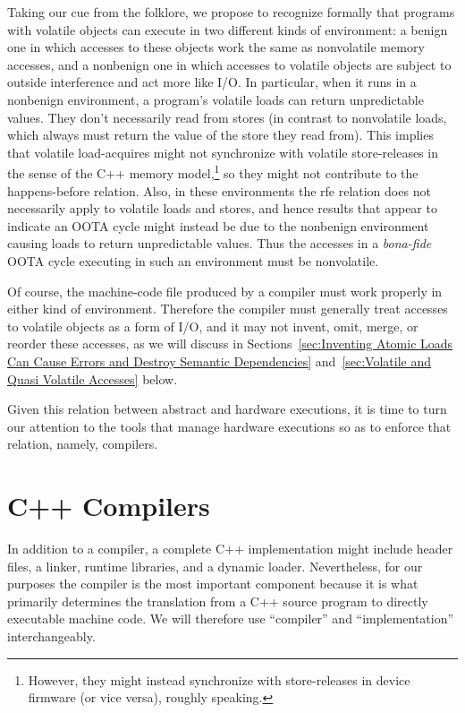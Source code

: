 Taking our cue from the folklore, we propose to recognize formally
that programs with volatile objects can execute in two different kinds
of environment: a benign one in which accesses to these objects work
the same as nonvolatile memory accesses, and a nonbenign one in which
accesses to volatile objects are subject to outside interference and
act more like I/O.
In particular, when it runs in a nonbenign environment, a program's
volatile loads can return unpredictable values.
They don't necessarily read from stores (in contrast to nonvolatile loads,
which always must return the value of the store they read from).
This implies that volatile load-acquires might not synchronize with
volatile store-releases in the sense of the C++ memory model,\footnote{
	However, they might instead synchronize with store-releases in
	device firmware (or vice versa), roughly speaking.}
so they might not contribute to the happens-before relation.
Also, in these environments the rfe relation does not necessarily apply
to volatile loads and stores, and hence results that appear to indicate
an OOTA cycle might instead be due to the nonbenign environment causing
loads to return unpredictable values.
Thus the accesses in a {\it bona-fide} OOTA cycle executing in such an
environment must be nonvolatile.

Of course, the machine-code file produced by a compiler must work
properly in either kind of environment.
Therefore the compiler must generally treat accesses to volatile objects
as a form of I/O, and it may not
invent, omit, merge, or reorder these accesses, as we will discuss in
Sections~\ref{sec:Inventing Atomic Loads Can Cause Errors and Destroy Semantic Dependencies}
and~\ref{sec:Volatile and Quasi Volatile Accesses} below.

Given this relation between abstract and hardware executions, it is time
to turn our attention to the tools that manage hardware executions so as
to enforce that relation, namely, compilers.

\section{C++ Compilers}
\label{sec:C++ Compilers}

In addition to a compiler, a complete C++ implementation might include
 header files, a linker, runtime libraries, and a dynamic loader.
Nevertheless, for our purposes the compiler is the most important
component because it is what primarily determines the translation from
a C++ source program to directly executable machine code.
We will therefore use ``compiler'' and ``implementation'' interchangeably.

